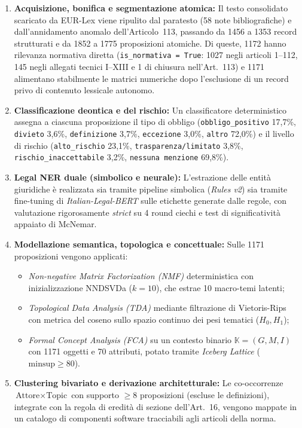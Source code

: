 \documentclass[12pt,a4paper,oneside]{article}
\begin{document}
\begin{enumerate}
    \item \textbf{Acquisizione, bonifica e segmentazione atomica:} Il testo consolidato scaricato da EUR-Lex viene ripulito dal paratesto (58 note bibliografiche) e dall'annidamento anomalo dell'Articolo~113, passando da \num{1456} a \num{1353} record strutturati e da \num{1852} a \num{1775} proposizioni atomiche. Di queste, \num{1172} hanno rilevanza normativa diretta (\texttt{is\_normativa = True}: \num{1027} negli articoli 1--112, 145 negli allegati tecnici I--XIII e 1 di chiusura nell'Art.~113) e \num{1171} alimentano stabilmente le matrici numeriche dopo l'esclusione di un record privo di contenuto lessicale autonomo.
    \item \textbf{Classificazione deontica e del rischio:} Un classificatore deterministico assegna a ciascuna proposizione il tipo di obbligo (\texttt{obbligo\_positivo} 17,7\%, \texttt{divieto} 3,6\%, \texttt{definizione} 3,7\%, \texttt{eccezione} 3,0\%, \texttt{altro} 72,0\%) e il livello di rischio (\texttt{alto\_rischio} 23,1\%, \texttt{trasparenza/limitato} 3,8\%, \texttt{rischio\_inaccettabile} 3,2\%, \texttt{nessuna menzione} 69,8\%).
    \item \textbf{Legal NER duale (simbolico e neurale):} L'estrazione delle entità giuridiche è realizzata sia tramite pipeline simbolica (\emph{Rules v2}) sia tramite fine-tuning di \emph{Italian-Legal-BERT} sulle etichette generate dalle regole, con valutazione rigorosamente \emph{strict} su 4 round ciechi e test di significatività appaiato di McNemar.
    \item \textbf{Modellazione semantica, topologica e concettuale:} Sulle \num{1171} proposizioni vengono applicati:
    \begin{itemize}
        \item \emph{Non-negative Matrix Factorization (NMF)} deterministica con inizializzazione NNDSVDa ($k=10$), che estrae 10 macro-temi latenti;
        \item \emph{Topological Data Analysis (TDA)} mediante filtrazione di Vietoris-Rips con metrica del coseno sullo spazio continuo dei pesi tematici ($H_0, H_1$);
        \item \emph{Formal Concept Analysis (FCA)} su un contesto binario $\mathbb{K} = (G, M, I)$ con \num{1171} oggetti e 70 attributi, potato tramite \emph{Iceberg Lattice} ($\text{minsup} \ge 80$).
    \end{itemize}
    \item \textbf{Clustering bivariato e derivazione architetturale:} Le co-occorrenze $\text{Attore} \times \text{Topic}$ con supporto $\ge 8$ proposizioni (escluse le definizioni), integrate con la regola di eredità di sezione dell'Art.~16, vengono mappate in un catalogo di componenti software tracciabili agli articoli della norma.
\end{enumerate}
\end{document}

